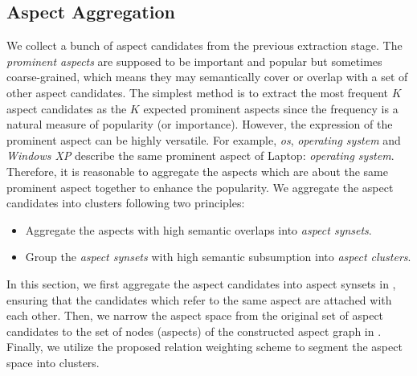 \subsection{Aspect Aggregation}
We collect a bunch of aspect candidates from the previous extraction stage. 
The \textit{prominent aspects} are supposed
to be important and popular but sometimes coarse-grained, which 
means they may semantically cover or overlap with a set of other aspect 
candidates.
The simplest method is to extract the most frequent $K$ aspect candidates as the $K$ expected prominent aspects
since the frequency is a natural measure of popularity (or importance).
However, the expression of the prominent aspect 
can be highly versatile. 
For example, \textit{os}, 
\textit{operating system}
and \textit{Windows XP}
describe the same prominent aspect of Laptop: 
\textit{operating system}.
Therefore, it is reasonable
to aggregate the aspects which are about the same 
prominent aspect together to enhance the popularity. 
We aggregate the aspect candidates 
into clusters following two principles:
\begin{itemize}
	\item  Aggregate the aspects with high semantic overlaps into \textit{aspect synsets}.
	\item Group the \textit{aspect synsets} 
	with high semantic subsumption into \textit{aspect clusters}.
\end{itemize}

In this section, we first aggregate the aspect candidates into aspect synsets in , 
ensuring that the candidates
which refer to the same aspect are attached with
each other.  
Then, we narrow the aspect space from the original set of  aspect candidates 
to the set of nodes (aspects) of the constructed aspect graph in
. 
Finally, we utilize the proposed relation weighting scheme 
to segment the aspect space into clusters.


